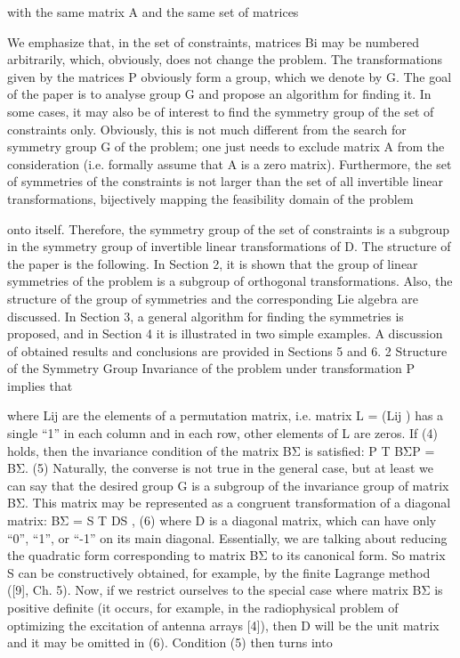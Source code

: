 with the same matrix A and the same set of matrices


We emphasize that, in the set of constraints, matrices Bi may be numbered
arbitrarily, which, obviously, does not change the problem. The transformations
given by the matrices P obviously form a group, which we denote by G. The
goal of the paper is to analyse group G and propose an algorithm for finding it.
In some cases, it may also be of interest to find the symmetry group of the
set of constraints only. Obviously, this is not much different from the search for
symmetry group G of the problem; one just needs to exclude matrix A from the
consideration (i.e. formally assume that A is a zero matrix). Furthermore, the
set of symmetries of the constraints is not larger than the set of all invertible
linear transformations, bijectively mapping the feasibility domain of the problem


onto itself. Therefore, the symmetry
group of the set of constraints is a subgroup in the symmetry group of invertible
linear transformations of D.
The structure of the paper is the following. In Section 2, it is shown that the
group of linear symmetries of the problem is a subgroup of orthogonal transformations. Also, the structure of the group of symmetries and the corresponding
Lie algebra are discussed. In Section 3, a general algorithm for finding the symmetries is proposed, and in Section 4 it is illustrated in two simple examples. A
discussion of obtained results and conclusions are provided in Sections 5 and 6.
2 Structure of the Symmetry Group
Invariance of the problem under transformation P implies that


where Lij are the elements of a permutation matrix, i.e. matrix L = (Lij ) has a
single “1” in each column and in each row, other elements of L are zeros.
If (4) holds, then the invariance condition of the matrix BΣ is satisfied:
P
T BΣP = BΣ. (5)
Naturally, the converse is not true in the general case, but at least we can say
that the desired group G is a subgroup of the invariance group of matrix BΣ.
This matrix may be represented as a congruent transformation of a diagonal
matrix:
BΣ = S
T DS , (6)
where D is a diagonal matrix, which can have only “0”, “1”, or “-1” on its main
diagonal. Essentially, we are talking about reducing the quadratic form corresponding to matrix BΣ to its canonical form. So matrix S can be constructively
obtained, for example, by the finite Lagrange method ([9], Ch. 5).
Now, if we restrict ourselves to the special case where matrix BΣ is positive
definite (it occurs, for example, in the radiophysical problem of optimizing the
excitation of antenna arrays [4]), then D will be the unit matrix and it may be
omitted in (6). Condition (5) then turns into

